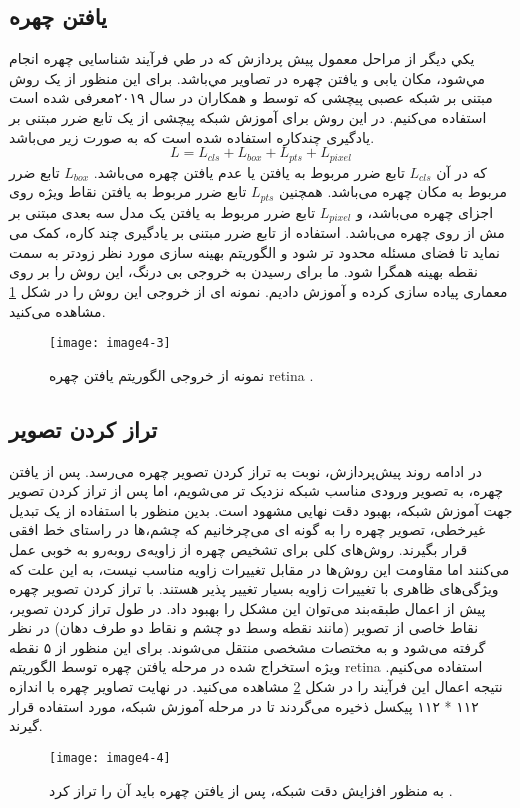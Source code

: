 \subsection{یافتن چهره}
يكي ديگر از مراحل معمول پيش پردازش كه در طي فرآيند شناسایی چهره انجام مي‌شود، مکان یابی و یافتن چهره در تصاوير مي‌باشد. برای این منظور از یک روش مبتنی بر شبکه عصبی پیچشی که توسط  و همکاران \cite{deng2019retinaface} در سال ۲۰۱۹معرفی شده است استفاده می‌کنیم. در این روش برای آموزش شبکه پیچشی از یک تابع ضرر مبتنی بر یادگیری چندکاره  استفاده شده است که به صورت زیر می‌باشد.
\begin{equation}\label{eq3-2}
L = L_{cls} + L_{box} + L_{pts} + L_{pixel}  
\end{equation}
\noindent
که در آن $L_{cls}$ تابع ضرر مربوط به یافتن یا عدم یافتن چهره می‌باشد. $L_{box}$ تابع ضرر مربوط به مکان چهره می‌باشد. همچنین $L_{pts}$ تابع ضرر مربوط به یافتن نقاط ویژه روی اجزای چهره می‌باشد، و $L_{pixel}$ تابع ضرر مربوط به یافتن یک مدل سه بعدی مبتنی بر مش از روی چهره می‌باشد. استفاده از تابع ضرر مبتنی بر یادگیری چند کاره، کمک می نماید تا فضای مسئله محدود تر شود و الگوریتم بهینه سازی مورد نظر زودتر به سمت نقطه بهینه همگرا شود. ما برای رسیدن به خروجی بی درنگ، این روش را بر روی معماری  پیاده سازی کرده و آموزش دادیم. نمونه ای از خروجی این روش را در شکل \ref{image4-3} مشاهده می‌کنید. 
\begin{figure}[h]
\centering
  \texttt{[image: image4-3]}
  \caption{نمونه از خروجی الگوریتم یافتن چهره retina \cite{deng2019retinaface}.}
  \label{image4-3}
\end{figure}

\subsection{تراز کردن تصویر}
در ادامه روند پیش‌پردازش، نوبت به تراز کردن تصویر چهره  می‌رسد. پس از یافتن چهره، به تصویر ورودی مناسب شبکه نزدیک تر می‌شویم، اما پس از تراز کردن تصویر جهت آموزش شبکه، بهبود دقت نهایی مشهود است.  بدین منظور با استفاده از یک تبدیل غیرخطی، تصویر چهره را به گونه ای می‌چرخانیم که چشم،ها در راستای خط افقی قرار بگیرند. روش‌های کلی برای تشخیص چهره از زاویه‌ی روبه‌رو به خوبی عمل می‌کنند اما مقاومت این روش‌ها در مقابل تغییرات زاویه مناسب نیست، به این علت که ویژگی‌های ظاهری با تغییرات زاویه بسیار تغییر پذیر هستند. با تراز کردن تصویر چهره پیش از اعمال طبقه‌بند می‌توان این مشکل را بهبود داد. در طول ‌تراز کردن تصویر، نقاط خاصی از تصویر (مانند نقطه‌ وسط دو چشم و نقاط دو طرف دهان) در نظر گرفته می‌شود و به مختصات مشخصی منتقل می‌شوند. برای این منظور از ۵ نقطه ویژه استخراج شده در مرحله یافتن چهره توسط الگوریتم retina استفاده می‌کنیم. نتیجه اعمال این فرآیند را در شکل \ref{image4-4} مشاهده می‌کنید. در نهایت تصاویر چهره با اندازه ۱۱۲ * ۱۱۲ پیکسل ذخیره می‌گردند تا در مرحله آموزش شبکه، مورد استفاده قرار گیرند.
\begin{figure}[h]
\centering
  \texttt{[image: image4-4]}
  \caption{به منظور افزایش دقت شبکه، پس از یافتن چهره باید آن را تراز کرد \cite{}.}
  \label{image4-4}
\end{figure}

